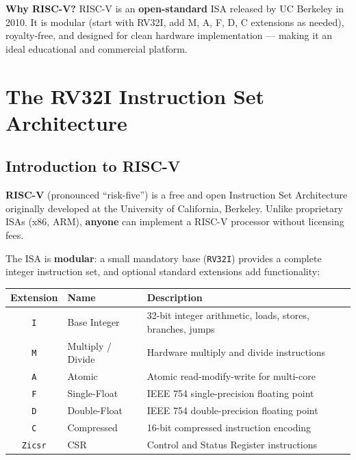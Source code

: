 \documentclass[12pt, a4paper, oneside]{book}
\begin{document}
\begin{keybox}
\textbf{\color{gold}Why RISC-V?}
RISC-V is an \textbf{open-standard} ISA released by UC Berkeley in 2010. It is modular (start with RV32I, add M, A, F, D, C extensions as needed), royalty-free, and designed for clean hardware implementation --- making it an ideal educational and commercial platform.
\end{keybox}

\newpage

\chapter{The RV32I Instruction Set Architecture}

\section{Introduction to RISC-V}

\textbf{RISC-V} (pronounced ``risk-five'') is a free and open Instruction Set Architecture originally developed at the University of California, Berkeley. Unlike proprietary ISAs (x86, ARM), \textbf{anyone} can implement a RISC-V processor without licensing fees.

The ISA is \textbf{modular}: a small mandatory base (\texttt{RV32I}) provides a complete integer instruction set, and optional standard extensions add functionality:

\begin{center}
\renewcommand{\arraystretch}{1.3}
\begin{tabular}{c l l}
\toprule
\textbf{\color{purple}Extension} & \textbf{\color{purple}Name} & \textbf{\color{purple}Description} \\
\midrule
\texttt{I} & Base Integer        & 32-bit integer arithmetic, loads, stores, branches, jumps \\
\texttt{M} & Multiply / Divide   & Hardware multiply and divide instructions \\
\texttt{A} & Atomic              & Atomic read-modify-write for multi-core \\
\texttt{F} & Single-Float        & IEEE 754 single-precision floating point \\
\texttt{D} & Double-Float        & IEEE 754 double-precision floating point \\
\texttt{C} & Compressed          & 16-bit compressed instruction encoding \\
\texttt{Zicsr} & CSR              & Control and Status Register instructions \\
\bottomrule
\end{tabular}
\end{center}
\end{document}
